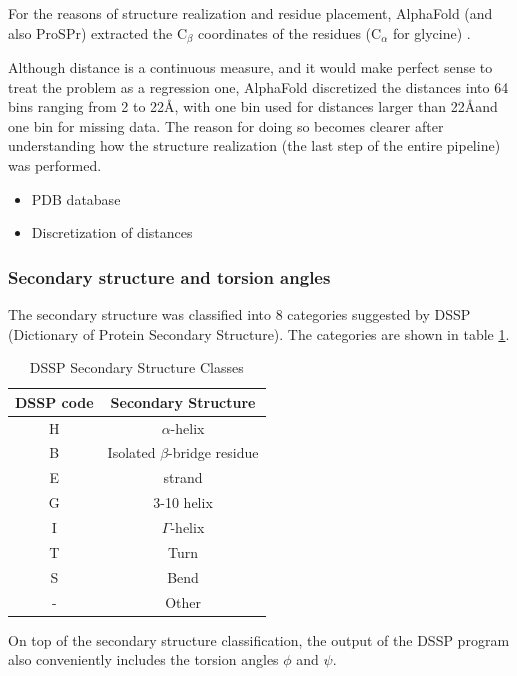 For the reasons of structure realization and residue placement, AlphaFold (and also ProSPr) extracted the C$_\beta$ coordinates of the residues (C$_\alpha$ for glycine) \cite{alphafold}.
        
Although distance is a continuous measure, and it would make perfect sense to treat the problem as a regression one, AlphaFold discretized the distances into 64 bins ranging from 2 to 22\AA, with one bin used for distances larger than 22\AA and one bin for missing data. 
The reason for doing so becomes clearer after understanding how the structure realization (the last step of the entire pipeline) was performed.
    
\begin{itemize}
    \item PDB database
    \item Discretization of distances
\end{itemize}
        
\subsubsection{Secondary structure and torsion angles}
        
The secondary structure was classified into 8 categories suggested by DSSP (Dictionary of Protein Secondary Structure). 
The categories are shown in table \ref{tab:dssp}.
        
\begin{table}[ht]
    \centering
    \begin{tabular}{c|c}
        DSSP code & Secondary Structure\\ 
        \hline
        H     & $\alpha$-helix \\
        B     & Isolated $\beta$-bridge residue \\
        E     & strand \\
        G     & 3-10 helix \\
        I     & $\Gamma$-helix \\
        T     & Turn \\
        S     & Bend \\
        -     & Other 
    \end{tabular}
    \caption{DSSP Secondary Structure Classes}
    \label{tab:dssp}
\end{table}
        
On top of the secondary structure classification, the output of the DSSP program also conveniently includes the torsion angles $\phi$ and $\psi$.
        
